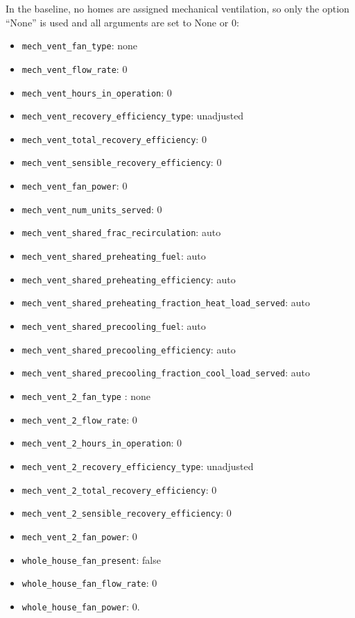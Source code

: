 In the baseline, no homes are assigned mechanical ventilation, so only the option ``None'' is used and all arguments are set to None or 0:
\begin{itemize}
    \item \texttt{mech\_vent\_fan\_type}: none
    \item \texttt{mech\_vent\_flow\_rate}: 0
    \item \texttt{mech\_vent\_hours\_in\_operation}: 0 
    \item \texttt{mech\_vent\_recovery\_efficiency\_type}: unadjusted
    \item \texttt{mech\_vent\_total\_recovery\_efficiency}: 0 
    \item \texttt{mech\_vent\_sensible\_recovery\_efficiency}: 0 
    \item \texttt{mech\_vent\_fan\_power}: 0
    \item \texttt{mech\_vent\_num\_units\_served}: 0
    \item \texttt{mech\_vent\_shared\_frac\_recirculation}: auto
    \item \texttt{mech\_vent\_shared\_preheating\_fuel}: auto
    \item \texttt{mech\_vent\_shared\_preheating\_efficiency}: auto
    \item \texttt{mech\_vent\_shared\_preheating\_fraction\_heat\_load\_served}: auto
    \item \texttt{mech\_vent\_shared\_precooling\_fuel}: auto
    \item \texttt{mech\_vent\_shared\_precooling\_efficiency}: auto
    \item \texttt{mech\_vent\_shared\_precooling\_fraction\_cool\_load\_served}: auto
    \item \texttt{mech\_vent\_2\_fan\_type} : none
    \item \texttt{mech\_vent\_2\_flow\_rate}: 0
    \item \texttt{mech\_vent\_2\_hours\_in\_operation}: 0 
    \item \texttt{mech\_vent\_2\_recovery\_efficiency\_type}: unadjusted
    \item \texttt{mech\_vent\_2\_total\_recovery\_efficiency}: 0
    \item \texttt{mech\_vent\_2\_sensible\_recovery\_efficiency}: 0
    \item \texttt{mech\_vent\_2\_fan\_power}: 0  
    \item \texttt{whole\_house\_fan\_present}: false
    \item \texttt{whole\_house\_fan\_flow\_rate}: 0 
    \item \texttt{whole\_house\_fan\_power}: 0.
\end{itemize}


